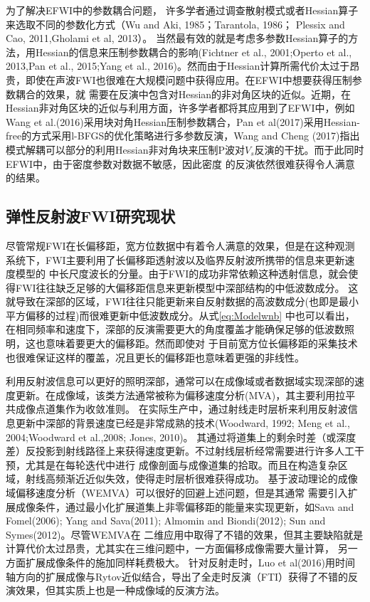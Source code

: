 为了解决EFWI中的参数耦合问题，
许多学者通过调查散射模式或者Hessian算子来选取不同的参数化方式（Wu and Aki, 1985\cite{wu.aki:1985}；Tarantola, 1986\cite{tarantola:1986}；
Plessix and Cao, 2011\cite{plessix.cao:2011},Gholami et al, 2013\cite{gholami2013}）。
当然最有效的就是考虑多参数Hessian算子的方法，用Hessian的信息来压制参数耦合的影响(Fichtner et al., 2001\cite{fichtner2011hessian};Operto et al.,
2013\cite{operto2013guided},Pan et al., 2015\cite{pan2015estimation};Yang et al.,
2016\cite{Yang2016})。然而由于Hessian计算所需代价太过于昂贵，即使在声波FWI也很难在大规模问题中获得应用。在EFWI中想要获得压制参数耦合的效果，就
需要在反演中包含对Hessian的非对角区块的近似。近期，在Hessian非对角区块的近似与利用方面，许多学者都将其应用到了EFWI中，例如Wang
et al.(2016)\cite{WangEtAl2016}采用块对角Hessian压制参数耦合，Pan et
al(2017)\cite{PanEtAl2017}采用Hessian-free的方式采用l-BFGS的优化策略进行多参数反演，Wang and Cheng
(2017)\cite{WangEtAl2017}指出模式解耦可以部分的利用Hessian非对角块来压制P波对$V_s$反演的干扰。而于此同时EFWI中，由于密度参数对数据不敏感，因此密度
的反演依然很难获得令人满意的结果。
\subsection{弹性反射波FWI研究现状}
尽管常规FWI在长偏移距，宽方位数据中有着令人满意的效果，但是在这种观测系统下，FWI主要利用了长偏移距透射波以及临界反射波所携带的信息来更新速度模型的
中长尺度波长的分量。由于FWI的成功非常依赖这种透射信息，就会使得FWI往往缺乏足够的大偏移距信息来更新模型中深部结构的中低波数成分。
这就导致在深部的区域，FWI往往只能更新来自反射数据的高波数成分(也即是最小平方偏移的过程)而很难更新中低波数成分。从式\ref{eq:Modelwnb}
中也可以看出，在相同频率和速度下，深部的反演需要更大的角度覆盖才能确保足够的低波数照明，这也意味着要更大的偏移距。然而即使对
于目前宽方位长偏移距的采集技术也很难保证这样的覆盖，况且更长的偏移距也意味着更强的非线性\cite{sirgue2006importance,virieux2009overview}。

利用反射波信息可以更好的照明深部，通常可以在成像域或者数据域实现深部的速度更新。在成像域，该类方法通常被称为偏移速度分析(MVA)，其主要利用拉平
共成像点道集作为收敛准则。
在实际生产中，通过射线走时层析来利用反射波信息更新中深部的背景速度已经是非常成熟的技术(Woodward,
1992\cite{Woodward1992}; Meng et al., 2004\cite{MengEtAl2004};Woodward et al.,2008\cite{
Woodward2008}; Jones, 2010\cite{Jones2010})。
其通过将道集上的剩余时差（或深度差）反投影到射线路径上来获得速度更新。不过射线层析经常需要进行许多人工干预，尤其是在每轮迭代中进行
成像剖面与成像道集的拾取。而且在构造复杂区域，射线高频渐近近似失效，使得走时层析很难获得成功。
基于波动理论的成像域偏移速度分析（WEMVA）可以很好的回避上述问题，但是其通常
需要引入扩展成像条件，通过最小化扩展道集上非零偏移距的能量来实现更新，如Sava and
Fomel(2006)\cite{SavaEtAl2006}; Yang and Sava(2011)\cite{YangEtAl2011}; Almomin and
Biondi(2012)\cite{Almomin2012}; Sun and Symes(2012)\cite{SunEtAl2012}。尽管WEMVA在
二维应用中取得了不错的效果，但其主要缺陷就是计算代价太过昂贵，尤其实在三维问题中，一方面偏移成像需要大量计算，
另一方面扩展成像条件的施加同样耗费极大。
针对反射走时，Luo et
al(2016)\cite{Luo2016}用时间轴方向的扩展成像与Rytov近似结合，导出了全走时反演（FTI）获得了不错的反演效果，但其实质上也是一种成像域的反演方法。

